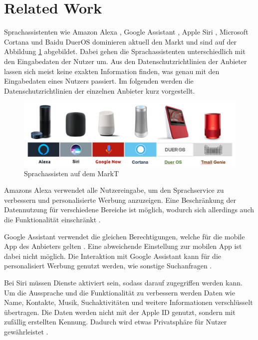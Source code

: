 \section{Related Work}
Sprachassistenten wie Amazon Alexa \cite{alexaAssitent}, Google Assistant \cite{googleAssistant}, Apple Siri \cite{siriAssistent}, Microsoft Cortana \cite{cortanaAssistent} und Baidu DuerOS \cite{baiduAssistant} dominieren aktuell den Markt und sind auf der Abbildung \ref{fig:sprachassistenten} abgebildet. Dabei gehen die Sprachassistenten unterschiedlich mit den Eingabedaten der Nutzer um. Aus den Datenschutzrichtlinien der Anbieter lassen sich meist keine exakten Information finden, was genau mit den Eingabedaten eines Nutzers passiert. Im folgenden werden die Datenschutzrichtlinien der einzelnen Anbieter kurz vorgestellt.
\begin{figure}[h!]
	\centering
	\includegraphics[width=1\linewidth]{Picture/Sprachassistenten}
	\caption[Sprachassisten auf dem MarkT]{Sprachassisten auf dem MarkT}
	\label{fig:sprachassistenten}
\end{figure}

Amazons Alexa verwendet alle Nutzereingabe, um den Sprachservice zu verbessern und personalisierte Werbung anzuzeigen. Eine Beschränkung der Datennutzung für verschiedene Bereiche ist möglich, wodurch sich allerdings auch die Funktionalität einschränkt \cite{alexaPrivacy}.

Google Assistant verwendet die gleichen Berechtigungen, welche für die mobile App des Anbieters gelten \cite{googleShare}. Eine abweichende Einstellung zur mobilen App ist dabei nicht möglich. Die Interaktion mit Google Assistant kann für die personalisiert Werbung genutzt werden, wie sonstige Suchanfragen \cite{googlePrivacy}.

Bei Siri müssen Dienste aktiviert sein, sodass darauf zugegriffen werden kann. Um die Aussprache und die Funktionalität zu verbessern werden Daten wie Name, Kontakte, Musik, Suchaktivitäten und weitere Informationen verschlüsselt übertragen. Die Daten werden nicht mit der Apple ID genutzt, sondern mit zufällig erstellten Kennung. Dadurch wird etwas Privatsphäre für Nutzer gewährleistet \cite{siriPrivacy}.


